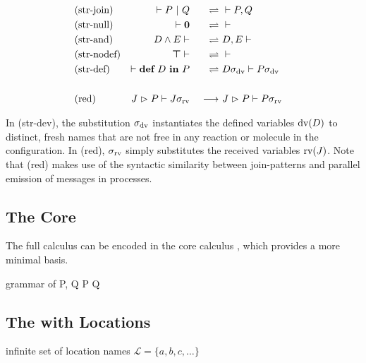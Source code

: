 \begin{align*}
  \rchamequ{str-join}{
    \rchamcnf{}{P \jpar Q}
  }{
    \rchamcnf{}{P, Q}
  }
  \\
  \rchamequ{str-null}{
    \rchamcnf{}{\jnullproc}
  }{
    \rchamcnf{}{}
  }
  \\
  \rchamequ{str-and}{
    \rchamcnf{D \jcon E}{}
  }{
    \rchamcnf{D, E}{}
  }
  \\
  \rchamequ{str-nodef}{
    \rchamcnf{\jnulldef}{}
  }{
    \rchamcnf{}{}
  }
  \\
  \rchamequ{str-def}{
    \rchamcnf{}{\jdef{D}{P}}
  }{
    \rchamcnf{D\sigma_{\opdv}}{P\sigma_{\opdv}}
  }
  \\
  \\
  \rchamred{red}{
    \rchamcnf{\jrct{J}{P}}{J\sigma_{\oprv}}
  }{
    \rchamcnf{\jrct{J}{P}}{P\sigma_{\oprv}}
  }
\end{align*}

In (str-dev), the substitution $\sigma_{\operatorname{dv}}$ instantiates the defined
variables $\operatorname{dv}(D)$ to distinct, fresh names that are not free in any reaction
or molecule in the configuration.
In (red), $\sigma_{\operatorname{rv}}$ simply substitutes the received variables $\operatorname{rv}(J)$.
Note that (red) makes use of the syntactic similarity between join-patterns
and parallel emission of messages in processes.


\subsection{The Core \JoinCalc}

The full calculus can be encoded in the core calculus
\cite{fournet_reflexive_1996},
which provides a more minimal basis.

\begin{JDef}{grammar of \monadicjoincalc}
  P, Q
  \grmr {}
  \altn P \jpar Q
  \altn {}
\end{JDef}


\subsection{The \JoinCalc with Locations}

\cite{fournet_calculus_1996}


infinite set of location names
$ \mathcal{L} = \{ a, b, c, \ldots \} $

